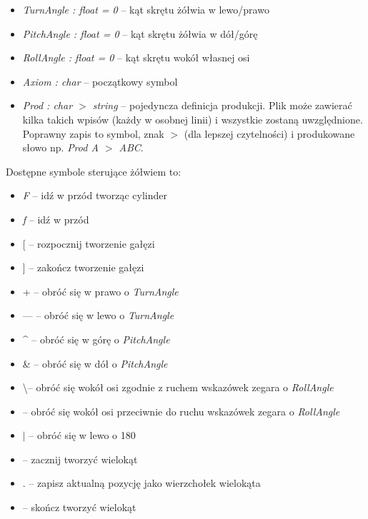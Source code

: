 \documentclass[inz,shortabstract]{iithesis}
\begin{document}
        \begin{itemize}
            \item \textit{TurnAngle : float = 0} -- kąt skrętu żółwia w lewo/prawo
            \item \textit{PitchAngle : float = 0} -- kąt skrętu żółwia w dół/górę 
            \item \textit{RollAngle : float = 0} -- kąt skrętu wokół własnej osi
            \item \textit{Axiom : char} -- początkowy symbol
            \item \textit{Prod : char $>$ string } -- pojedyncza definicja produkcji. Plik może zawierać kilka takich wpisów (każdy w osobnej linii) i wszystkie zostaną uwzględnione. Poprawny zapis to symbol, znak $>$ (dla lepszej czytelności) i produkowane słowo np. \textit{Prod A $>$ ABC}. 
        \end{itemize}
        
        Dostępne symbole sterujące żółwiem to:
        \begin{itemize}
            \item \textit{F} -- idź w przód tworząc cylinder
            \item \textit{f} -- idź w przód
            \item {[} -- rozpocznij tworzenie gałęzi
            \item {]} -- zakończ tworzenie gałęzi
            \item + -- obróć się w prawo o \textit{TurnAngle}
            \item --- -- obróć się w lewo o \textit{TurnAngle}
            \item \^{} -- obróć się w górę o \textit{PitchAngle}
            \item \& -- obróć się w dół o \textit{PitchAngle}
            \item \textbackslash -- obróć się wokół osi zgodnie z ruchem wskazówek zegara o \textit{RollAngle}
            \item \text{/} -- obróć się wokół osi przeciwnie do ruchu wskazówek zegara o \textit{RollAngle}
            \item $|$ -- obróć się w lewo o 180\degree
            \item \textbraceleft -- zacznij tworzyć wielokąt
            \item . -- zapisz aktualną pozycję jako wierzchołek wielokąta
            \item \textbraceright -- skończ tworzyć wielokąt
        \end{itemize}
        
\end{document}

